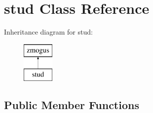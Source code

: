 \hypertarget{classstud}{}\section{stud Class Reference}
\label{classstud}
Inheritance diagram for stud\+:\begin{figure}[H]
\begin{center}
\leavevmode
\includegraphics[height=2.000000cm]{classstud}
\end{center}
\end{figure}
\subsection*{Public Member Functions}
